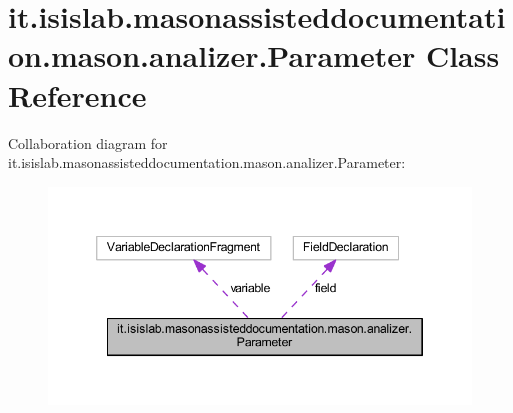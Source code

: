 \hypertarget{classit_1_1isislab_1_1masonassisteddocumentation_1_1mason_1_1analizer_1_1_parameter}{\section{it.\-isislab.\-masonassisteddocumentation.\-mason.\-analizer.\-Parameter Class Reference}
\label{classit_1_1isislab_1_1masonassisteddocumentation_1_1mason_1_1analizer_1_1_parameter}
}


Collaboration diagram for it.\-isislab.\-masonassisteddocumentation.\-mason.\-analizer.\-Parameter\-:\nopagebreak
\begin{figure}[H]
\begin{center}
\leavevmode
\includegraphics[width=346pt]{classit_1_1isislab_1_1masonassisteddocumentation_1_1mason_1_1analizer_1_1_parameter__coll__graph}
\end{center}
\end{figure}
